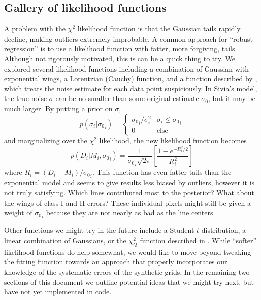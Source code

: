 \documentclass[preprint]{aastex} %
\newcommand{\fMi}{M_i}
\newcommand{\fDi}{D_i}
\begin{document}
\subsection{Gallery of likelihood functions}
\label{sec:gal}
A problem with the $\chi^2$ likelihood function is that the Gaussian tails rapidly decline, making outliers extremely improbable. A common approach for ``robust regression'' is to use a likelihood function with fatter, more forgiving, tails. Although not rigorously motivated, this is can be a quick thing to try. We explored several likelihood functions including a combination of Gaussian with exponential wings, a Lorentzian (Cauchy) function, and a function described  by \citet{ss06}, which treats the noise estimate for each data point suspiciously. In Sivia's model, the true noise $\sigma$ can be no smaller than some original estimate $\sigma_0$, but it may be much larger. By putting a prior on $\sigma$, 
\begin{equation}
  p(\sigma_i | {\sigma_0}_i) = \left \{ \begin{array}{cc}
    {\sigma_0}_i/\sigma_i^2 & \sigma_i  \leq {\sigma_0}_i\\
    0                 & \textrm{else}
  \end{array}
    \right.
\end{equation}
and marginalizing over the $\chi^2$ likelihood, the new likelihood function becomes
\begin{equation}
p(\fDi | \fMi, {\sigma_0}_i) = \frac{1}{ {\sigma_0}_i \sqrt{2 \pi}} \left [ \frac{1 - e^{-R_i^2/2}}{R_i^2} \right ] 
\end{equation}
where $R_i = (\fDi - \fMi)/{\sigma_0}_i$. This function has even fatter tails than the exponential model and seems to give results less biased by outliers, however it is not truly satisfying. Which lines contributed most to the posterior? What about the wings of class I and II errors? These individual pixels might still be given a weight of ${\sigma_0}_i$ because they are not nearly as bad as the line centers.

Other functions we might try in the future include a Student-$t$ distribution, a linear combination of Gaussians, or the $\chi^2_Q$ function described in \citet{hbl10}. While ``softer'' likelihood functions do help somewhat, we would like to move beyond tweaking the fitting function towards an approach that properly incorporates our knowledge of the systematic errors of the synthetic grids. In the remaining two sections of this document we outline potential ideas that we might try next, but have not yet implemented in code.
\end{document}
